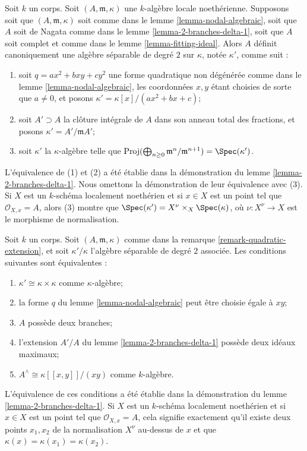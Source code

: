 \begin{remark} \label{remark-quadratic-extension} Soit $k$ un corps. Soit $(A, \mathfrak m, \kappa)$ une $k$-algèbre locale noethérienne. Supposons soit que $(A, \mathfrak m, \kappa)$ soit comme dans le lemme \ref{lemma-nodal-algebraic}, soit que $A$ soit de Nagata comme dans le lemme \ref{lemma-2-branches-delta-1}, soit que $A$ soit complet et comme dans le lemme \ref{lemma-fitting-ideal}. Alors $A$ définit canoniquement une algèbre séparable de degré $2$ sur $\kappa$, notée $\kappa'$, comme suit : \begin{enumerate} \item soit $q = ax^2 + bxy + cy^2$ une forme quadratique non dégénérée comme dans le lemme \ref{lemma-nodal-algebraic}, les coordonnées $x, y$ étant choisies de sorte que $a \not = 0$, et posons $\kappa' = \kappa[x]/(ax^2 + bx + c)$; \item soit $A' \supset A$ la clôture intégrale de $A$ dans son anneau total des fractions, et posons $\kappa' = A'/\mathfrak m A'$; \item soit $\kappa'$ la $\kappa$-algèbre telle que $\text{Proj}(\bigoplus_{n \geq 0} \mathfrak m^n/\mathfrak m^{n + 1}) =
\Spec(\kappa')$. \end{enumerate} L'équivalence de (1) et (2) a été établie dans la démonstration du lemme \ref{lemma-2-branches-delta-1}. Nous omettons la démonstration de leur équivalence avec (3). Si $X$ est un $k$-schéma localement noethérien et si $x \in X$ est un point tel que $\mathcal{O}_{X, x} = A$, alors (3) montre que $\Spec(\kappa') = X^\nu \times_X \Spec(\kappa)$, où $\nu : X^\nu \to X$ est le morphisme de normalisation.
\end{remark}

\begin{remark} \label{remark-trivial-quadratic-extension} Soit $k$ un corps. Soit $(A, \mathfrak m, \kappa)$ comme dans la remarque \ref{remark-quadratic-extension}, et soit $\kappa'/\kappa$ l'algèbre séparable de degré $2$ associée. Les conditions suivantes sont équivalentes : \begin{enumerate} \item $\kappa' \cong \kappa \times \kappa$ comme $\kappa$-algèbre; \item la forme $q$ du lemme \ref{lemma-nodal-algebraic} peut être choisie égale à $xy$; \item $A$ possède deux branches; \item l'extension $A'/A$ du lemme \ref{lemma-2-branches-delta-1} possède deux idéaux maximaux; \item $A^\wedge \cong \kappa[[x, y]]/(xy)$ comme $k$-algèbre. \end{enumerate} L'équivalence de ces conditions a été établie dans la démonstration du lemme \ref{lemma-2-branches-delta-1}. Si $X$ est un $k$-schéma localement noethérien et si $x \in X$ est un point tel que $\mathcal{O}_{X, x} = A$, cela signifie exactement qu'il existe deux points $x_1, x_2$ de la normalisation $X^\nu$ au-dessus de $x$ et que $\kappa(x) = \kappa(x_1) = \kappa(x_2)$.
\end{remark}

